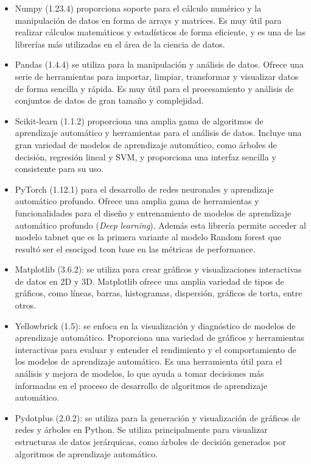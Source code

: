 \documentclass[
]{article}
\begin{document}
\begin{itemize}
\item
  Numpy (1.23.4) proporciona soporte para el cálculo numérico y la manipulación de datos en forma de arrays y matrices. Es muy útil para realizar cálculos matemáticos y estadísticos de forma eficiente, y es una de las librerías más utilizadas en el área de la ciencia de datos.
\item
  Pandas (1.4.4) se utiliza para la manipulación y análisis de datos. Ofrece una serie de herramientas para importar, limpiar, transformar y visualizar datos de forma sencilla y rápida. Es muy útil para el procesamiento y análisis de conjuntos de datos de gran tamaño y complejidad.
\item
  Scikit-learn (1.1.2) proporciona una amplia gama de algoritmos de aprendizaje automático y herramientas para el análisis de datos. Incluye una gran variedad de modelos de aprendizaje automático, como árboles de decisión, regresión lineal y SVM, y proporciona una interfaz sencilla y consistente para su uso.
\item
  PyTorch (1.12.1) para el desarrollo de redes neuronales y aprendizaje automático profundo. Ofrece una amplia gama de herramientas y funcionalidades para el diseño y entrenamiento de modelos de aprendizaje automático profundo (\emph{Deep} \emph{learning}). Además esta librería permite acceder al modelo tabnet que es la primera variante al modelo Random forest que resultó ser el esocigod tcon base en las métricas de performance.
\item
  Matplotlib (3.6.2): se utiliza para crear gráficos y visualizaciones interactivas de datos en 2D y 3D. Matplotlib ofrece una amplia variedad de tipos de gráficos, como líneas, barras, histogramas, dispersión, gráficos de torta, entre otros.
\item
  Yellowbrick (1.5): se enfoca en la visualización y diagnóstico de modelos de aprendizaje automático. Proporciona una variedad de gráficos y herramientas interactivas para evaluar y entender el rendimiento y el comportamiento de los modelos de aprendizaje automático. Es una herramienta útil para el análisis y mejora de modelos, lo que ayuda a tomar decisiones más informadas en el proceso de desarrollo de algoritmos de aprendizaje automático.
\item
  Pydotplus (2.0.2): se utiliza para la generación y visualización de gráficos de redes y árboles en Python. Se utiliza principalmente para visualizar estructuras de datos jerárquicas, como árboles de decisión generados por algoritmos de aprendizaje automático.

\end{itemize}
\end{document}
